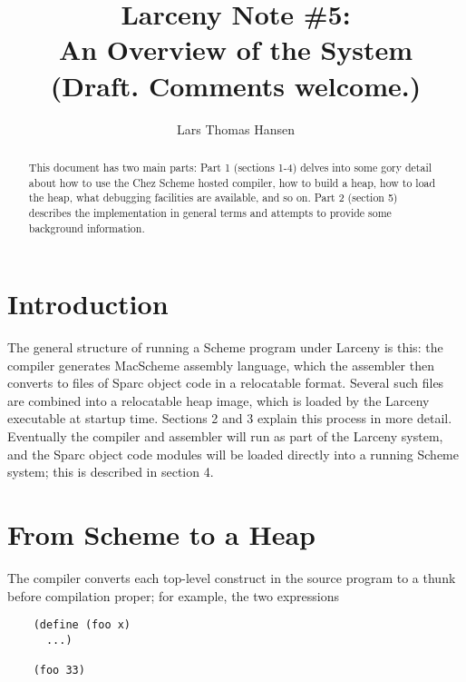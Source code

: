 

\title{Larceny Note \#5: \\
       An Overview of the System \\
       {\tenrm (Draft. Comments welcome.)}}
\author{Lars Thomas Hansen}


\maketitle

\begin{abstract}
This document has two main parts: Part 1 (sections 1-4) delves into some
gory detail about how to use the Chez Scheme hosted compiler, how to build a
heap, how to load the heap, what debugging facilities are available, and so
on. Part 2 (section 5) describes the implementation in general terms and
attempts to provide some background information.

\end{abstract}

\section{Introduction}

The general structure of running a Scheme program under Larceny is this: the
compiler generates MacScheme assembly language, which the assembler
then converts to files of Sparc object code in a relocatable format.
Several such files are combined into a relocatable heap image, which
is loaded by the Larceny executable at startup time. Sections
2 and 3 explain this process in more detail. Eventually the
compiler and assembler will run as part of the Larceny system, and the
Sparc object code modules will be loaded directly into a running
Scheme system; this is described in section 4.


\section{From Scheme to a Heap}
\label{compiling}

The compiler converts each top-level construct in the source program
to a thunk before compilation proper; for example, the two expressions

\begin{minipage}{\linewidth}
\begin{verbatim}
    (define (foo x)
      ...)

    (foo 33)
\end{verbatim}
\end{minipage}

